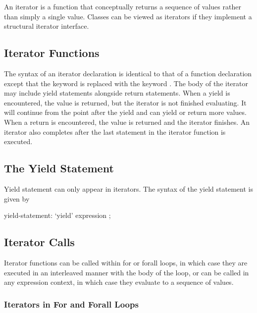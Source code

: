 \label{Iterators}

An iterator is a function that conceptually returns a sequence of
values rather than simply a single value.  Classes can be viewed as
iterators if they implement a structural iterator interface.

\subsection{Iterator Functions}
\label{Iterator_Functions}

The syntax of an iterator declaration is identical to that of a
function declaration except that the keyword  is replaced
with the keyword .  The body of the iterator may
include yield statements alongside return statements.  When a yield is
encountered, the value is returned, but the iterator is not finished
evaluating.  It will continue from the point after the yield and can
yield or return more values.  When a return is encountered, the value
is returned and the iterator finishes.  An iterator also completes
after the last statement in the iterator function is executed.

\subsection{The Yield Statement}
\label{The_Yield_Statement}

Yield statement can only appear in iterators.  The syntax of the yield
statement is given by
\begin{syntax}
yield-statement:
  `yield' expression ;
\end{syntax}

\subsection{Iterator Calls}
\label{Iterator_Calls}

Iterator functions can be called within for or forall loops, in which
case they are executed in an interleaved manner with the body of the
loop, or can be called in any expression context, in which case they
evaluate to a sequence of values.

\subsubsection{Iterators in For and Forall Loops}
\label{Iterators_in_For_and_Forall_Loops}


